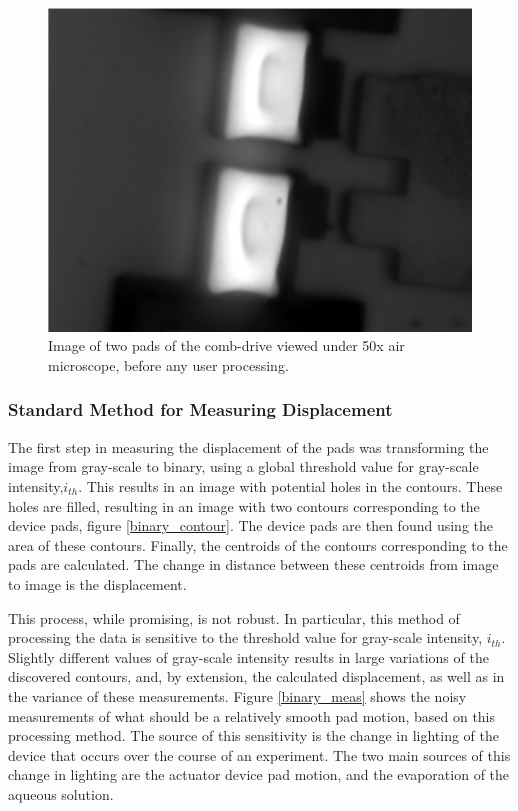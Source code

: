 \begin{figure}[htpb]
    \begin{center}
    \includegraphics[width=0.6\linewidth]{Chapter2/Figs/Raster/device_processed_displace.png}
    \caption{Image of two pads of the comb-drive viewed under 50x air microscope, before any user processing.}\label{orig_device}
    \end{center}
\end{figure}

\subsubsection{Standard Method for Measuring Displacement}
The first step in measuring the displacement of the pads was transforming the image from gray-scale to binary, using a global threshold value for gray-scale intensity,$i_{th}$. This results in an image with potential holes in the contours. These holes are filled, resulting in an image with two contours corresponding to the device pads, figure \ref{binary_contour}. The device pads are then found using the area of these contours. Finally, the centroids of the contours corresponding to the pads are calculated. The change in distance between these centroids from image to image is the displacement.

This process, while promising, is not robust. In particular, this method of processing the data is sensitive to the threshold value for gray-scale intensity, $i_{th}$. Slightly different values of gray-scale intensity results in large variations of the discovered contours, and, by extension, the calculated displacement, as well as in the variance of these measurements. Figure \ref{binary_meas} shows the noisy measurements of what should be a relatively smooth pad motion, based on this processing method.
The source of this sensitivity is the change in lighting of the device that occurs over the course of an experiment. The two main sources of this change in lighting are the actuator device pad motion, and the evaporation of the aqueous solution. 

